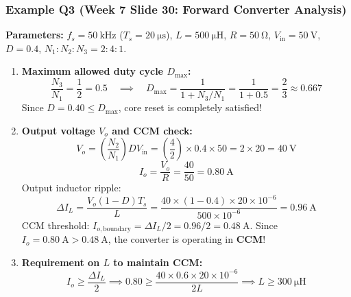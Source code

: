 \subsubsection{Example Q3 (Week 7 Slide 30: Forward Converter Analysis)}
\textbf{Parameters:} $f_s = \SI{50}{\kilo\hertz}$ ($T_s = \SI{20}{\micro\second}$), $L = \SI{500}{\micro\henry}$, $R = \SI{50}{\ohm}$, $V_{\mathrm{in}} = \SI{50}{\volt}$, $D = 0.4$, $N_1:N_2:N_3 = 2:4:1$.
\begin{enumerate}
  \item \textbf{Maximum allowed duty cycle $D_{\max}$:}
  \[
  \frac{N_3}{N_1} = \frac{1}{2} = 0.5 \quad\implies\quad D_{\max} = \frac{1}{1 + N_3/N_1} = \frac{1}{1 + 0.5} = \frac{2}{3} \approx 0.667
  \]
  Since $D = 0.40 \le D_{\max}$, core reset is completely satisfied!
  \item \textbf{Output voltage $V_o$ and CCM check:}
  \[
  V_o = \left(\frac{N_2}{N_1}\right) D V_{\mathrm{in}} = \left(\frac{4}{2}\right) \times 0.4 \times 50 = 2 \times 20 = \SI{40}{\volt}
  \]
  \[
  I_o = \frac{V_o}{R} = \frac{40}{50} = \SI{0.80}{\ampere}
  \]
  Output inductor ripple:
  \[
  \Delta I_L = \frac{V_o (1-D) T_s}{L} = \frac{40 \times (1-0.4) \times 20\times 10^{-6}}{500\times 10^{-6}} = \SI{0.96}{\ampere}
  \]
  CCM threshold: $I_{o,\mathrm{boundary}} = \Delta I_L / 2 = 0.96 / 2 = \SI{0.48}{\ampere}$.
  Since $I_o = \SI{0.80}{\ampere} > \SI{0.48}{\ampere}$, the converter is operating in \textbf{CCM}!
  \item \textbf{Requirement on $L$ to maintain CCM:}
  \[
  I_o \ge \frac{\Delta I_L}{2} \implies 0.80 \ge \frac{40 \times 0.6 \times 20\times 10^{-6}}{2 L} \implies L \ge \SI{300}{\micro\henry}
  \]
\end{enumerate}

